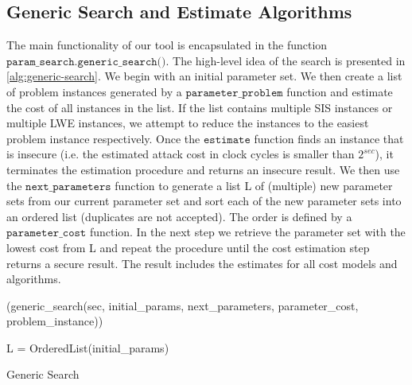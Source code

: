 \subsection{Generic Search and Estimate Algorithms}
The main functionality of our tool is encapsulated in the function $\texttt{param\_search.generic\_search()}$. The high-level idea of the search is presented in \cref{alg:generic-search}. We begin with an initial parameter set. We then create a list of problem instances generated by a $\texttt{parameter\_problem}$ function and estimate the cost of all instances in the list. If the list contains multiple SIS instances or multiple LWE instances, we attempt to reduce the instances to the easiest problem instance respectively. %
Once the $\texttt{estimate}$ function finds an instance that is insecure (i.e. the estimated attack cost in clock cycles is smaller than $2^{sec}$), it terminates the estimation procedure and returns an insecure result. We then use the $\texttt{next\_parameters}$ function to generate a list L of (multiple) new parameter sets from our current parameter set and sort each of the new parameter sets into an ordered list (duplicates are not accepted). The order is defined by a $\texttt{parameter\_cost}$ function. In the next step we retrieve the parameter set with the lowest cost from L and repeat the procedure until the cost estimation step returns a secure result. The result includes the estimates for all cost models and algorithms.

\begin{algorithm2e} %
    \Begin(generic\_search(sec, initial\_params, next\_parameters, parameter\_cost,  problem\_instance)) %
    {
        L = OrderedList(initial\_params)\\

    }
    \caption{Generic Search} \label{alg:generic-search}
\end{algorithm2e}

